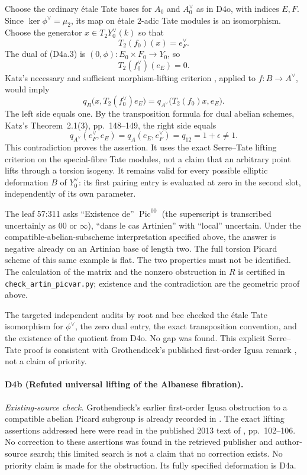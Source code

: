 Choose the ordinary étale Tate bases for $A_0$ and $A_0^\vee$
as in D4o, with indices $E,F$. Since $\ker\phi^\vee=\mu_2$,
its map on étale $2$-adic Tate modules is an isomorphism. Choose
the generator $x\in T_2Y_0^\vee(k)$ so that
\[
 T_2(f_0)(x)=e_F^\vee.
\]
The dual of (D4a.3) is $(0,\phi):E_0\times F_0\to Y_0$,
so
\[
 T_2(f_0^\vee)(e_E)=0.
\]
Katz's necessary and sufficient morphism-lifting criterion
\cite[Theorem 2.1(4), p.~149]{DGJ_Katz1981}, applied to
$f:B\to A^\vee$, would imply
\[
 q_B\bigl(x,T_2(f_0^\vee)e_E\bigr)
    =q_{A^\vee}\bigl(T_2(f_0)x,e_E\bigr).
\]
The left side equals one. By the transposition formula for dual
abelian schemes, Katz's Theorem~2.1(3), pp.~148--149, the right
side equals
\[
 q_{A^\vee}(e_F^\vee,e_E)=q_A(e_E,e_F^\vee)
      =q_{12}=1+\epsilon\ne1.
\]
This contradiction proves the assertion. It uses the exact
Serre--Tate lifting criterion on the special-fibre Tate modules,
not a claim that an arbitrary point lifts through a torsion
isogeny. It remains valid for every possible elliptic deformation
$B$ of $Y_0^\vee$: its first pairing entry is evaluated at zero
in the second slot, independently of its own parameter.

The leaf 57:311 asks ``Existence de'' $\operatorname{Pic}^{00}$
(the superscript is transcribed uncertainly as $00$ or $\infty$),
``dans le cas Artinien'' with ``local'' uncertain. Under the
compatible-abelian-subscheme interpretation specified above,
the answer is negative already on an Artinian base of length two. The full torsion Picard scheme
of this same example is flat. The two properties must not be
identified. The calculation of the matrix and the nonzero
obstruction in $R$ is certified in
\texttt{check\_artin\_picvar.py}; existence and the contradiction
are the geometric proof above.

The targeted independent audits by root and bce checked the étale Tate
isomorphism for $\phi^\vee$, the zero dual entry, the exact
transposition convention, and the existence of the quotient from
D4o. No gap was found. This explicit Serre--Tate proof is consistent
with Grothendieck's published first-order Igusa remark
\cite[Remark 3.4, p.~238]{DGJ_FGAVI1962}, not a claim of priority.

\paragraph{D4b (Refuted universal lifting of the Albanese fibration).}
\emph{Existing-source check.}
Grothendieck's earlier first-order Igusa obstruction to a compatible
abelian Picard subgroup is already recorded in
\cite[Remark 3.4, p.~238]{DGJ_FGAVI1962}.
The exact lifting assertions addressed here were read in the published
2013 text of \cite{DGJ_Partsch2013}, pp.~102--106.
No correction to these assertions was found in the retrieved
publisher and author-source search; this limited search is not a
claim that no correction exists. No priority claim is made for the
obstruction. Its fully specified deformation is D4a.

